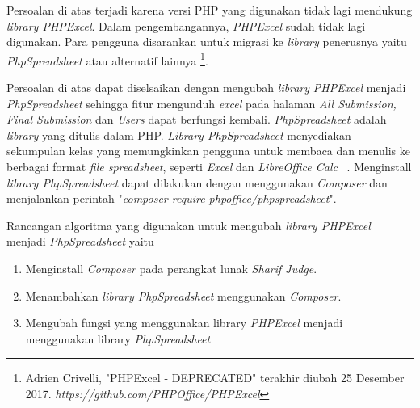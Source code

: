 	Persoalan di atas terjadi karena versi PHP yang digunakan tidak lagi mendukung \textit{library PHPExcel}. Dalam pengembangannya, \textit{PHPExcel} sudah tidak lagi digunakan. Para pengguna disarankan untuk migrasi ke \textit{library} penerusnya yaitu \textit{PhpSpreadsheet} atau alternatif lainnya \footnote{Adrien Crivelli, "PHPExcel - DEPRECATED" terakhir diubah 25 Desember 2017. \textit{https://github.com/PHPOffice/PHPExcel}}.
	
	Persoalan di atas dapat diselsaikan dengan mengubah \textit{library} \textit{PHPExcel} menjadi \textit{PhpSpreadsheet} sehingga fitur mengunduh \textit{excel} pada halaman \textit{All Submission, Final Submission} dan \textit{Users} dapat berfungsi kembali. \textit{PhpSpreadsheet} adalah \textit{library} yang ditulis dalam PHP. \textit{Library PhpSpreadsheet} menyediakan sekumpulan kelas yang memungkinkan pengguna untuk membaca dan menulis ke berbagai format \textit{file spreadsheet}, seperti \textit{Excel} dan \textit{LibreOffice Calc} ~\cite{phpoffice:10:phpspreadsheet}. Menginstall \textit{library PhpSpreadsheet} dapat dilakukan dengan menggunakan \textit{Composer} dan menjalankan perintah "\textit{composer require phpoffice/phpspreadsheet}".
	
	Rancangan algoritma yang digunakan untuk mengubah \textit{library PHPExcel} menjadi \textit{PhpSpreadsheet} yaitu
	\begin{enumerate}
		\item Menginstall \textit{Composer} pada perangkat lunak \textit{Sharif Judge}.
		\item Menambahkan \textit{library PhpSpreadsheet} menggunakan \textit{Composer}.
		\item Mengubah fungsi yang menggunakan library \textit{PHPExcel} menjadi menggunakan library \textit{PhpSpreadsheet}
	\end{enumerate}
	
